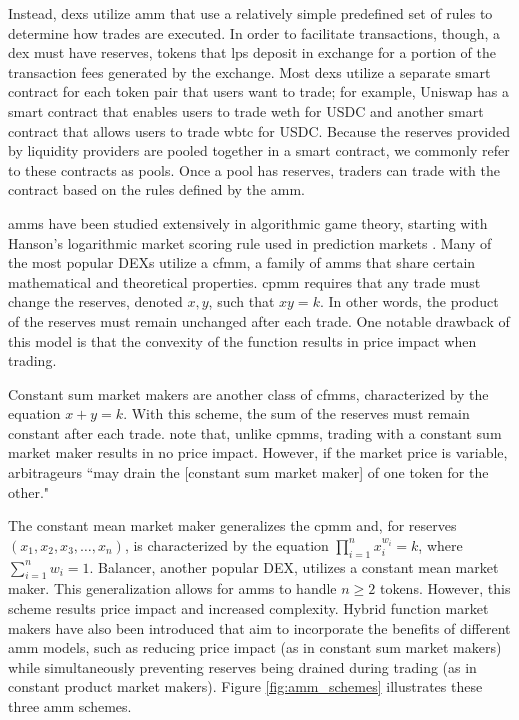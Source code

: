 \documentclass[11pt]{article}
\begin{document}
Instead, \glspl{dex} utilize \gls{amm} that use a relatively simple predefined set of rules to determine how trades are executed. In order to facilitate transactions, though, a \gls{dex} must have reserves, tokens that \glspl{lp} deposit in exchange for a portion of the transaction fees generated by the exchange. Most \glspl{dex} utilize a separate smart contract for each token pair that users want to trade; for example, Uniswap has a smart contract that enables users to trade \gls{weth} for USDC and another smart contract that allows users to trade \gls{wbtc} for USDC. Because the reserves provided by liquidity providers are pooled together in a smart contract, we commonly refer to these contracts as pools. Once a \gls{pool} has reserves, traders can trade with the contract based on the rules defined by the \gls{amm}.

\glspl{amm} have been studied extensively in algorithmic game theory, starting with Hanson's logarithmic market scoring rule used in prediction markets \cite{LMSR}. Many of the most popular DEXs utilize a \gls{cfmm}, a family of \glspl{amm} that share certain mathematical and theoretical properties. \gls{cpmm} requires that any trade must change the reserves, denoted $x, y$, such that $xy = k$. In other words, the product of the reserves must remain unchanged after each trade. One notable drawback of this model is that the convexity of the function results in price impact when trading.

Constant sum market makers are another class of \glspl{cfmm}, characterized by the equation $x + y = k$. With this scheme, the sum of the reserves must remain constant after each trade. \citet{AMMClasses} note that, unlike \glspl{cpmm}, trading with a constant sum market maker results in no price impact. However, if the market price is variable, arbitrageurs ``may drain the [constant sum market maker] of one token for the other."

The constant mean market maker generalizes the \gls{cpmm} and, for reserves $(x_1, x_2, x_3, \dots, x_n)$, is characterized by the equation $\prod_{i=1}^{n}x_i^{w_i} = k$, where $\sum_{i=1}^{n}w_i = 1$. Balancer, another popular DEX, utilizes a constant mean market maker. This generalization allows for \glspl{amm} to handle $n \ge 2$ tokens. However, this scheme results price impact and increased complexity. Hybrid function market makers have also been introduced that aim to incorporate the benefits of different \gls{amm} models, such as reducing price impact (as in constant sum market makers) while simultaneously preventing reserves being drained during trading (as in constant product market makers). Figure \ref{fig:amm_schemes} illustrates these three \gls{amm} schemes.
\end{document}

